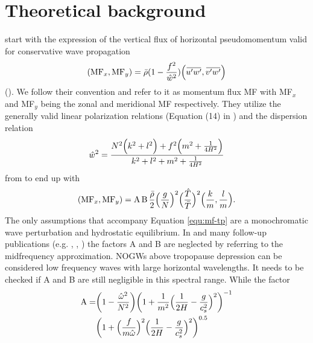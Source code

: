 \section{Theoretical background}
\textcite{ern_absolute_2004} start with the expression of the vertical flux of horizontal pseudomomentum valid for conservative wave propagation
\begin{equation}
    (\mathrm{MF}_x, \mathrm{MF}_y) = \bar{\rho} (1-\frac{f^2}{\hat{w}^2}) \Bigl(\overbar{u'w'},\overbar{v'w'}\Bigr) 
    \label{equ:ps-mf}
\end{equation}
(\cite[]{fritts_gravity_2003}). We follow their convention and refer to it as momentum flux MF with MF$_x$ and MF$_y$ being the zonal and meridional MF respectively. They utilize the generally valid linear polarization relations (Equation (14) in \textcite[]{fritts_gravity_2003}) and the dispersion relation
\begin{equation}
    \hat{w}^2 = \frac{N^2 \Bigl(k^2+l^2\Bigr) + f^2 \Bigl(m^2 + \frac{1}{4H^2}\Bigr)}{k^2+l^2+m^2+\frac{1}{4H^2}}
    \label{equ_lid:dispersion_noAss}
\end{equation}
from \textcite[]{fritts_gravity_2003} to end up with
\begin{equation}
    (\mathrm{MF}_x, \mathrm{MF}_y) = \textrm{A} \, \textrm{B} \, \frac{\bar{\rho}}{2} \Bigl(\frac{g}{N}\Bigr)^2 {\Bigl(\frac{\hat{T}}{\bar{T}}\Bigr)^2} \Bigl(\frac{k}{m},\frac{l}{m}\Bigr).
    \label{equ:mf-tp}
\end{equation}
The only assumptions that accompany Equation \ref{equ:mf-tp} are a monochromatic wave perturbation and hydrostatic equilibrium. In \textcite[]{ern_absolute_2004} and many follow-up publications (e.g. \cite[]{preusse_characteristics_2014}, \cite[]{ern_gracile_2018}, \cite[]{hindley_gravity_2019}) the factors A and B are neglected by referring to the midfrequency approximation. NOGWs above tropopause depression can be considered low frequency waves with large horizontal wavelengths. It needs to be checked if A and B are still negligible in this spectral range. While the factor
\begin{equation}
    \begin{split}
        \textrm{A} = &\biggl(1-\frac{\hat{\omega}^2}{N^2}\biggr) \biggl(1 + \frac{1}{m^2} \Bigl(\frac{1}{2H}-\frac{g}{c_s^2}\Bigr)^2\biggr)^{-1} \\
            &\biggl(1+\Bigl(\frac{f}{m \hat{\omega}}\Bigr)^2 \Bigl(\frac{1}{2H} - \frac{g}{c_s^2}\Bigr)^2\biggr)^{0.5}
    \end{split}
    \label{equ:A}
\end{equation}
